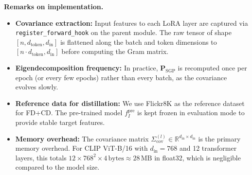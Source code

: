 \documentclass{article}
\begin{document}
\vspace{0.5em}
\noindent\textbf{Remarks on implementation.}
\begin{itemize}
    \item \textbf{Covariance extraction:} Input features to each LoRA layer are captured via \texttt{register\_forward\_hook} on the parent module. The raw tensor of shape $[n, d_{\text{token}}, d_{\text{in}}]$ is flattened along the batch and token dimensions to $[n \cdot d_{\text{token}}, d_{\text{in}}]$ before computing the Gram matrix.
    \item \textbf{Eigendecomposition frequency:} In practice, $\mathbf{P}_{\text{SGP}}$ is recomputed once per epoch (or every few epochs) rather than every batch, as the covariance evolves slowly.
    \item \textbf{Reference data for distillation:} We use Flickr8K as the reference dataset for FD+CD. The pre-trained model $f_I^{\text{pre}}$ is kept frozen in evaluation mode to provide stable target features.
    \item \textbf{Memory overhead:} The covariance matrix $\Sigma_{\text{cov}}^{(l)} \in \mathbb{R}^{d_{\text{in}} \times d_{\text{in}}}$ is the primary memory overhead. For CLIP ViT-B/16 with $d_{\text{in}} = 768$ and 12 transformer layers, this totals $12 \times 768^2 \times 4\,\text{bytes} \approx 28\,\text{MB}$ in float32, which is negligible compared to the model size.
\end{itemize}
\end{document}
